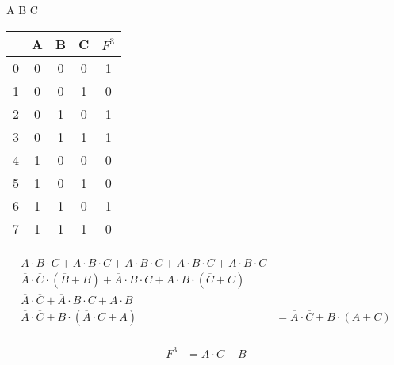 \documentclass{article}
\begin{document}
A B C
\begin{table}[ht]
    \begin{tabular}{c|c|c|c||c}
          & \textbf{A} & \textbf{B} & \textbf{C} & \textbf{\(F^3\)} \\
        \hline
        0 & 0          & 0          & 0          & 1                \\
        \hline
        1 & 0          & 0          & 1          & 0                \\
        \hline
        2 & 0          & 1          & 0          & 1                \\
        \hline
        3 & 0          & 1          & 1          & 1                \\
        \hline
        4 & 1          & 0          & 0          & 0                \\
        \hline
        5 & 1          & 0          & 1          & 0                \\
        \hline
        6 & 1          & 1          & 0          & 1                \\
        \hline
        7 & 1          & 1          & 1          & 0                \\
    \end{tabular}
\end{table}

\begin{align*}
    \overline{A} \cdot \overline{B} \cdot \overline{C} + \overline{A} \cdot B \cdot \overline{C} + \overline{A} \cdot B \cdot C + A \cdot B \cdot \overline{C} + A \cdot B \cdot C \\
    \overline{A} \cdot \overline{C} \cdot (\overline{B} + B) + \overline{A} \cdot B \cdot C + A \cdot B \cdot (\overline{C} + C)                                                   \\
    \overline{A} \cdot \overline{C} + \overline{A} \cdot B \cdot C + A \cdot B                                                                                                     \\
    \overline{A} \cdot \overline{C} + B \cdot (\overline{A} \cdot C + A) & = \overline{A} \cdot \overline{C} + B \cdot (A + C)                                                     \\
\end{align*}

\begin{align*}
    F^3 & = \overline{A} \cdot \overline{C} + B \\
\end{align*}
\end{document}
